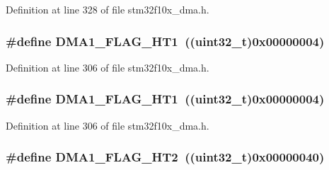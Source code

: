 Definition at line 328 of file stm32f10x\+\_\+dma.\+h.

\subsubsection[{\texorpdfstring{D\+M\+A1\+\_\+\+F\+L\+A\+G\+\_\+\+H\+T1}{DMA1_FLAG_HT1}}]{\setlength{\rightskip}{0pt plus 5cm}\#define D\+M\+A1\+\_\+\+F\+L\+A\+G\+\_\+\+H\+T1~(({\bf uint32\+\_\+t})0x00000004)}\hypertarget{group___d_m_a__flags__definition_ga9c806b96cfdcebddb64f70d13ad32270}{}\label{group___d_m_a__flags__definition_ga9c806b96cfdcebddb64f70d13ad32270}


Definition at line 306 of file stm32f10x\+\_\+dma.\+h.

\subsubsection[{\texorpdfstring{D\+M\+A1\+\_\+\+F\+L\+A\+G\+\_\+\+H\+T1}{DMA1_FLAG_HT1}}]{\setlength{\rightskip}{0pt plus 5cm}\#define D\+M\+A1\+\_\+\+F\+L\+A\+G\+\_\+\+H\+T1~(({\bf uint32\+\_\+t})0x00000004)}\hypertarget{group___d_m_a__flags__definition_ga9c806b96cfdcebddb64f70d13ad32270}{}\label{group___d_m_a__flags__definition_ga9c806b96cfdcebddb64f70d13ad32270}


Definition at line 306 of file stm32f10x\+\_\+dma.\+h.

\subsubsection[{\texorpdfstring{D\+M\+A1\+\_\+\+F\+L\+A\+G\+\_\+\+H\+T2}{DMA1_FLAG_HT2}}]{\setlength{\rightskip}{0pt plus 5cm}\#define D\+M\+A1\+\_\+\+F\+L\+A\+G\+\_\+\+H\+T2~(({\bf uint32\+\_\+t})0x00000040)}\hypertarget{group___d_m_a__flags__definition_gae154ffd90ebaec11f9ed1be00e69f149}{}\label{group___d_m_a__flags__definition_gae154ffd90ebaec11f9ed1be00e69f149}


